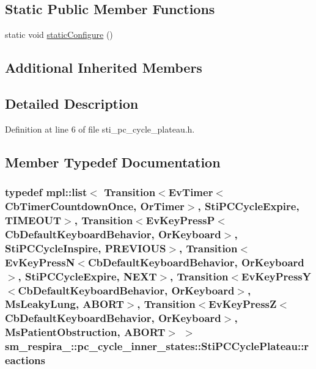 \subsection*{Static Public Member Functions}
\begin{DoxyCompactItemize}
\item 
static void \hyperlink{structsm__respira__1_1_1pc__cycle__inner__states_1_1StiPCCyclePlateau_a974b0fd58423dea9273e7068cbaa2d9a}{static\+Configure} ()
\end{DoxyCompactItemize}
\subsection*{Additional Inherited Members}


\subsection{Detailed Description}


Definition at line 6 of file sti\+\_\+pc\+\_\+cycle\+\_\+plateau.\+h.



\subsection{Member Typedef Documentation}
\subsubsection[{\texorpdfstring{reactions}{reactions}}]{\setlength{\rightskip}{0pt plus 5cm}typedef mpl\+::list$<$ Transition$<$Ev\+Timer$<$Cb\+Timer\+Countdown\+Once, {\bf Or\+Timer}$>$, {\bf Sti\+P\+C\+Cycle\+Expire}, {\bf T\+I\+M\+E\+O\+UT}$>$, Transition$<$Ev\+Key\+PressP$<$Cb\+Default\+Keyboard\+Behavior, {\bf Or\+Keyboard}$>$, {\bf Sti\+P\+C\+Cycle\+Inspire}, {\bf P\+R\+E\+V\+I\+O\+US}$>$, Transition$<$Ev\+Key\+PressN$<$Cb\+Default\+Keyboard\+Behavior, {\bf Or\+Keyboard}$>$, {\bf Sti\+P\+C\+Cycle\+Expire}, {\bf N\+E\+XT}$>$, Transition$<$Ev\+Key\+PressY$<$Cb\+Default\+Keyboard\+Behavior, {\bf Or\+Keyboard}$>$, {\bf Ms\+Leaky\+Lung}, {\bf A\+B\+O\+RT}$>$, Transition$<$Ev\+Key\+PressZ$<$Cb\+Default\+Keyboard\+Behavior, {\bf Or\+Keyboard}$>$, {\bf Ms\+Patient\+Obstruction}, {\bf A\+B\+O\+RT}$>$ $>$ {\bf sm\+\_\+respira\+\_\+::pc\+\_\+cycle\+\_\+inner\+\_\+states\+::\+Sti\+P\+C\+Cycle\+Plateau\+::reactions}}\hypertarget{structsm__respira__1_1_1pc__cycle__inner__states_1_1StiPCCyclePlateau_a0c51f165d5ab7bc19d821cb2d9b7154d}{}\label{structsm__respira__1_1_1pc__cycle__inner__states_1_1StiPCCyclePlateau_a0c51f165d5ab7bc19d821cb2d9b7154d}



